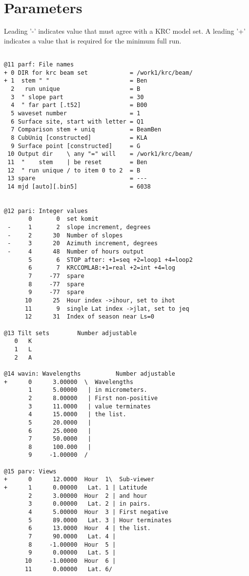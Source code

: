 \documentclass{article}
\begin{document}
\section{Parameters}
Leading '-' indicates value that must agree with a KRC model set. A leading '+' indicates a value that is required for the minimum full run.
\vspace{-3.mm} 
\begin{verbatim}

@11 parf: File names
+ 0 DIR for krc beam set            = /work1/krc/beam/
+ 1  stem " "                       = Ben
  2   run unique                    = B
  3  " slope part                   = 30
  4  " far part [.t52]              = B00
  5 waveset number                  = 1
  6 Surface site, start with letter = Q1
  7 Comparison stem + uniq          = BeamBen
  8 CubUniq [constructed]           = KLA
  9 Surface point [constructed]     = G
 10 Output dir    \ any "=" will    = /work1/krc/beam/
 11  "    stem    | be reset        = Ben
 12  " run unique / to item 0 to 2  = B
 13 spare                           = ---
 14 mjd [auto][.bin5]               = 6038


@12 pari: Integer values
       0       0  set komit
 -     1       2  slope increment, degrees
 -     2      30  Number of slopes
 -     3      20  Azimuth increment, degrees
 -     4      48  Number of hours output
       5       6  STOP after: +1=seq +2=loop1 +4=loop2
       6       7  KRCCOMLAB:+1=real +2=int +4=log
       7     -77  spare
       8     -77  spare
       9     -77  spare
      10      25  Hour index ->ihour, set to ihot
      11       9  single Lat index ->jlat, set to jeq
      12      31  Index of season near Ls=0

@13 Tilt sets        Number adjustable
   0   K
   1   L
   2   A

@14 wavin: Wavelengths          Number adjustable
+      0      3.00000  \  Wavelengths
       1      5.00000   | in micrometers.
       2      8.00000   | First non-positive
       3      11.0000   | value terminates
       4      15.0000   | the list.
       5      20.0000   |
       6      25.0000   |
       7      50.0000   |
       8      100.000   |
       9     -1.00000  /

@15 parv: Views                  
+      0      12.0000  Hour  1\  Sub-viewer
+      1      0.00000   Lat. 1 | Latitude
       2      3.00000  Hour  2 | and hour
       3      0.00000   Lat. 2 | in pairs.
       4      5.00000  Hour  3 | First negative
       5      89.0000   Lat. 3 | Hour terminates
       6      13.0000  Hour  4 | the list.
       7      90.0000   Lat. 4 | 
       8     -1.00000  Hour  5 | 
       9      0.00000   Lat. 5 | 
      10     -1.00000  Hour  6 | 
      11      0.00000   Lat. 6/


\end{verbatim}
\end{document}
